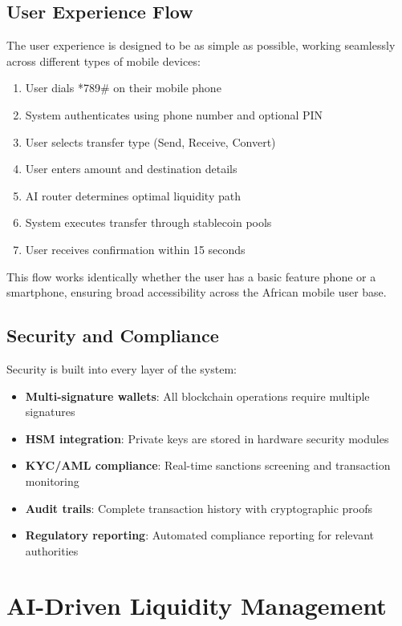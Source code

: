 \documentclass[11pt,a4paper]{article}
\begin{document}
\subsection{User Experience Flow}

The user experience is designed to be as simple as possible, working seamlessly across different types of mobile devices:

\begin{enumerate}
    \item User dials *789# on their mobile phone
    \item System authenticates using phone number and optional PIN
    \item User selects transfer type (Send, Receive, Convert)
    \item User enters amount and destination details
    \item AI router determines optimal liquidity path
    \item System executes transfer through stablecoin pools
    \item User receives confirmation within 15 seconds
\end{enumerate}

This flow works identically whether the user has a basic feature phone or a smartphone, ensuring broad accessibility across the African mobile user base.

\subsection{Security and Compliance}

Security is built into every layer of the system:

\begin{itemize}
    \item \textbf{Multi-signature wallets}: All blockchain operations require multiple signatures
    \item \textbf{HSM integration}: Private keys are stored in hardware security modules
    \item \textbf{KYC/AML compliance}: Real-time sanctions screening and transaction monitoring
    \item \textbf{Audit trails}: Complete transaction history with cryptographic proofs
    \item \textbf{Regulatory reporting}: Automated compliance reporting for relevant authorities
\end{itemize}

\section{AI-Driven Liquidity Management}
\end{document}
